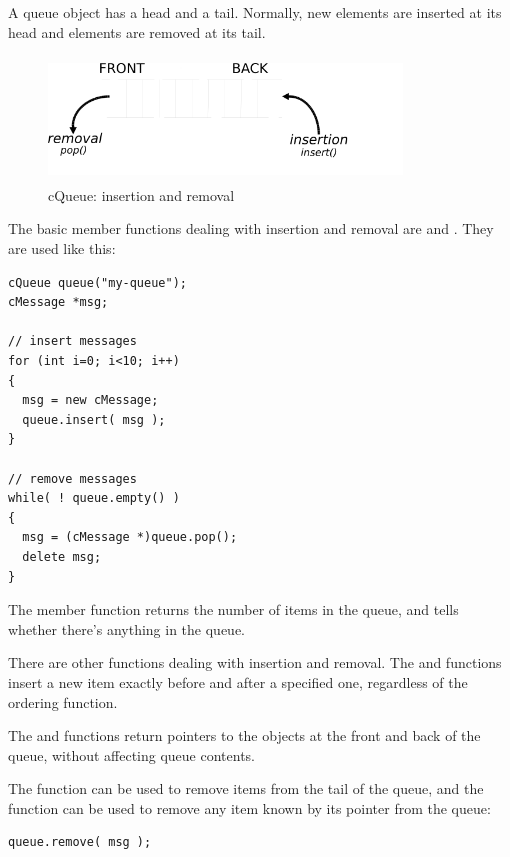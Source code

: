 A queue object has a head and a tail. Normally, new elements
are inserted at its head and elements are removed at its tail.


\begin{figure}[htbp]
  \begin{center}
    \includegraphics[width=3.703in, height=1.303in]{figures/queue}
    \caption{cQueue: insertion and removal}
    \label{fig:ch-sim-lib:cqueue}
  \end{center}
\end{figure}

The basic  member functions dealing with insertion and removal
are  and . They are used
like this:

\begin{verbatim}
cQueue queue("my-queue");
cMessage *msg;

// insert messages
for (int i=0; i<10; i++)
{
  msg = new cMessage;
  queue.insert( msg );
}

// remove messages
while( ! queue.empty() )
{
  msg = (cMessage *)queue.pop();
  delete msg;
}
\end{verbatim}


The  member function returns the number of items in the
queue, and  tells whether there's anything in the queue.

There are other functions dealing with insertion and removal.  The
 and  functions insert a
new item exactly before and after a specified one, regardless of the
ordering function.

The  and  functions return pointers to the objects
at the front and back of the queue, without affecting queue contents.

The  function can be used to remove items from the
tail of the queue, and the  function can be
used to remove any item known by its pointer from the queue:

\begin{verbatim}
queue.remove( msg );
\end{verbatim}



